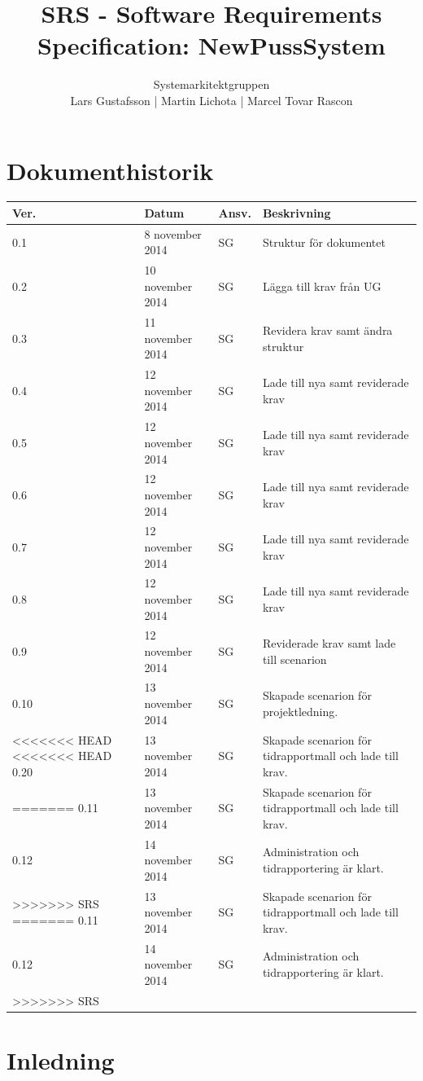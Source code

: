 \documentclass[a4paper]{article}
\title{SRS - Software Requirements Specification: NewPussSystem}
\author{Systemarkitektgruppen \\ Lars Gustafsson | Martin Lichota | Marcel Tovar Rascon}
\date{}
\begin{document}
\maketitle
\thispagestyle{fancy}
\tableofcontents
\newpage

\section*{Dokumenthistorik}

\begin{tabular}{ l l l l }
Ver. & Datum & Ansv. & Beskrivning \\\hline
0.1 & 8 november 2014 & SG & Struktur för dokumentet\\
0.2 & 10 november 2014 & SG & Lägga till krav från UG\\
0.3 & 11 november 2014 & SG & Revidera krav samt ändra struktur\\
0.4 & 12 november 2014 & SG & Lade till nya samt reviderade krav\\
0.5 & 12 november 2014 & SG & Lade till nya samt reviderade krav\\
0.6 & 12 november 2014 & SG & Lade till nya samt reviderade krav\\
0.7 & 12 november 2014 & SG & Lade till nya samt reviderade krav\\
0.8 & 12 november 2014 & SG & Lade till nya samt reviderade krav\\
0.9 & 12 november 2014 & SG & Reviderade krav samt lade till scenarion\\
0.10 & 13 november 2014 & SG & Skapade scenarion för projektledning.\\
<<<<<<< HEAD
<<<<<<< HEAD
0.20 & 13 november 2014 & SG & Skapade scenarion för tidrapportmall och lade till krav.\\
=======
0.11 & 13 november 2014 & SG & Skapade scenarion för tidrapportmall och lade till krav.\\
0.12 & 14 november 2014 & SG & Administration och tidrapportering är klart.\\

>>>>>>> SRS
=======
0.11 & 13 november 2014 & SG & Skapade scenarion för tidrapportmall och lade till krav.\\
0.12 & 14 november 2014 & SG & Administration och tidrapportering är klart.\\

>>>>>>> SRS
\end{tabular}
\section{Inledning}       
\end{document}
